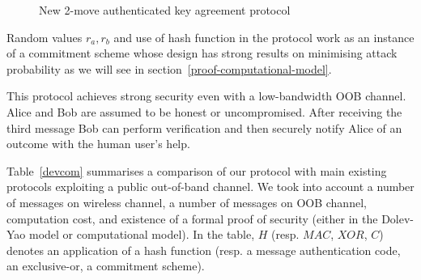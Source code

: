 \begin{figure}[b]
\begin{center}
\end{center}
\caption{New 2-move authenticated key agreement protocol} 
\label{improved-wong-stajano-protocol}
\end{figure}

Random values $r_a, r_b$ and use of hash function in the protocol work as an instance of a commitment scheme whose design has strong results on minimising attack probability as we will see in section~\ref{proof-computational-model}. 

This protocol achieves strong security even with a low-bandwidth OOB channel. Alice and Bob are assumed to be honest or uncompromised. After receiving the third message Bob can perform verification and then securely notify Alice of an outcome with the human user's help. 

Table~\ref{devcom} summarises a comparison of our protocol with main existing protocols exploiting a public out-of-band channel. We took into account a number of messages on wireless channel, a number of messages on OOB channel, computation cost, and existence of a formal proof of security (either in the Dolev-Yao model or computational model). In the table, $H$ (resp. $MAC$, $XOR$, $C$) denotes an application of a hash function (resp. a message authentication code, an exclusive-or, a commitment scheme).

